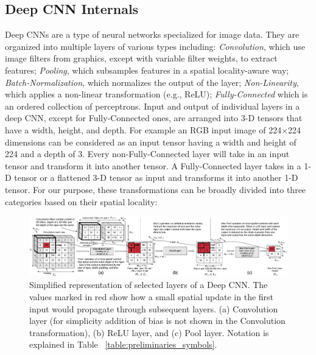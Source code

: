 \subsection{Deep CNN Internals}
Deep CNNs are a type of neural networks specialized for image data.
They are organized into multiple layers of various types including: \textit{Convolution}, which use image filters from graphics, except with variable filter weights, to extract features; \textit{Pooling}, which subsamples features in a spatial locality-aware way; \textit{Batch-Normalization}, which normalizes the output of the layer; \textit{Non-Linearity}, which applies a non-linear transformation (e.g., ReLU); \textit{Fully-Connected} which is an ordered collection of perceptrons.
Input and output of individual layers in a deep CNN, except for Fully-Connected ones, are arranged into 3-D tensors that have a width, height, and depth.
For example an RGB input image of 224$\times$224 dimensions can be considered as an input tensor having a width and height of 224 and a depth of 3.
Every non-Fully-Connected layer will take in an input tensor and transform it into another tensor.
A Fully-Connected layer takes in a 1-D tensor or a flattened 3-D tensor as input and transforms it into another 1-D tensor.
For our purpose, these transformations can be broadly divided into three categories based on their spatial locality:

\begin{figure}[t]
\includegraphics[width=\textwidth]{images/cnn_simplified}
\caption{Simplified representation of selected layers of a Deep CNN. The values marked in red show how a small spatial update in the first input would propagate through subsequent layers. (a) Convolution layer (for simplicity addition of bias is not shown in the Convolution transformation), (b) ReLU layer, and (c) Pool layer. Notation is explained in Table ~\ref{table:preliminaries_symbols}.}
\label{fig:cnn_simplified}
\end{figure}

